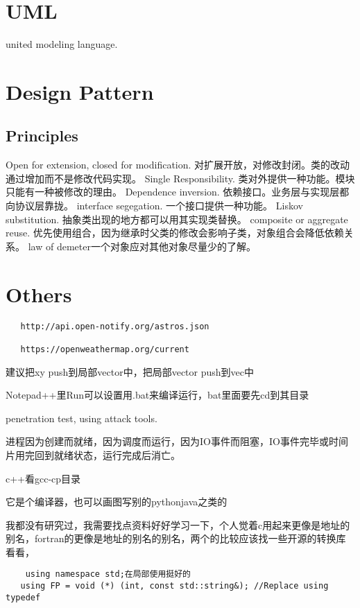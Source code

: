 \documentclass[UTF8]{article}
\begin{document}
\section{UML}
united modeling language. 


\section{Design Pattern}
\subsection{Principles}
Open for extension, closed for modification. 对扩展开放，对修改封闭。类的改动通过增加而不是修改代码实现。
Single Responsibility. 类对外提供一种功能。模块只能有一种被修改的理由。
Dependence inversion. 依赖接口。业务层与实现层都向协议层靠拢。
interface segegation. 一个接口提供一种功能。
Liskov substitution. 抽象类出现的地方都可以用其实现类替换。
composite or aggregate reuse. 优先使用组合，因为继承时父类的修改会影响子类，对象组合会降低依赖关系。
law of demeter一个对象应对其他对象尽量少的了解。



\section{Others}




\begin{lstlisting}
   http://api.open-notify.org/astros.json

   https://openweathermap.org/current

\end{lstlisting}


建议把xy push到局部vector中，把局部vector push到vec中

Notepad++里Run可以设置用.bat来编译运行，bat里面要先cd到其目录

penetration test, using attack tools.

进程因为创建而就绪，因为调度而运行，因为IO事件而阻塞，IO事件完毕或时间片用完回到就绪状态，运行完成后消亡。

c++看gcc-cp目录

它是个编译器，也可以画图写别的pythonjava之类的

我都没有研究过，我需要找点资料好好学习一下，个人觉着c用起来更像是地址的别名，fortran的更像是地址的别名的别名，两个的比较应该找一些开源的转换库看看，

\begin{lstlisting}
    using namespace std;在局部使用挺好的
   using FP = void (*) (int, const std::string&); //Replace using typedef
\end{lstlisting}
\end{document}
